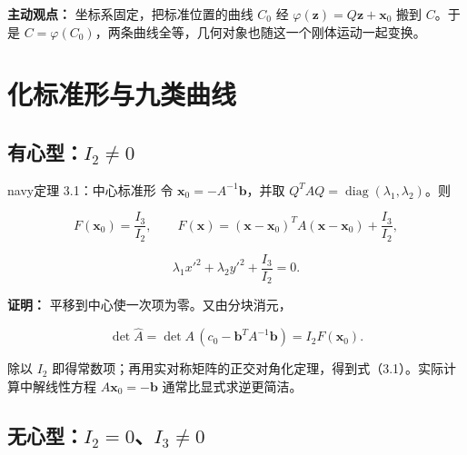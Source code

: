 \documentclass[11pt,a4paper]{article}
\begin{document}
\textbf{主动观点：} 坐标系固定，把标准位置的曲线 \(C_0\) 经
\(\varphi(\boldsymbol z)=Q\boldsymbol z+\boldsymbol x_0\) 搬到
\(C\)。于是
\(C=\varphi(C_0)\)，两条曲线全等，几何对象也随这一个刚体运动一起变换。

\section{化标准形与九类曲线}\label{ux5316ux6807ux51c6ux5f62ux4e0eux4e5dux7c7bux66f2ux7ebf}

\subsection{\texorpdfstring{有心型：\(I_2\ne0\)}{有心型：I\_2\textbackslash ne0}}\label{ux6709ux5fc3ux578bi_2ne0}

\begin{sboxenv}{navy}{定理 3.1：中心标准形}
令 \(\boldsymbol x_0=-A^{-1}\boldsymbol b\)，并取
\(Q^TAQ=\operatorname{diag}(\lambda_1,\lambda_2)\)。则

\begin{equation*}
F(\boldsymbol x_0)=\frac{I_3}{I_2},\qquad F(\boldsymbol x)=(\boldsymbol x-\boldsymbol x_0)^TA(\boldsymbol x-\boldsymbol x_0)+\frac{I_3}{I_2},
\end{equation*}

\begin{equation*}
\lambda_1x'^2+\lambda_2y'^2+\frac{I_3}{I_2}=0.\tag{3.1}
\end{equation*}

\end{sboxenv}

\textbf{证明：} 平移到中心使一次项为零。又由分块消元，

\begin{equation*}
\det\widehat A=\det A\,(c_0-\boldsymbol b^TA^{-1}\boldsymbol b)=I_2F(\boldsymbol x_0).
\end{equation*}

除以 \(I_2\)
即得常数项；再用实对称矩阵的正交对角化定理，得到式（3.1）。实际计算中解线性方程
\(A\boldsymbol x_0=-\boldsymbol b\) 通常比显式求逆更简洁。

\subsection{\texorpdfstring{无心型：\(I_2=0\)、\(I_3\ne0\)}{无心型：I\_2=0、I\_3\textbackslash ne0}}\label{ux65e0ux5fc3ux578bi_20i_3ne0}
\end{document}
